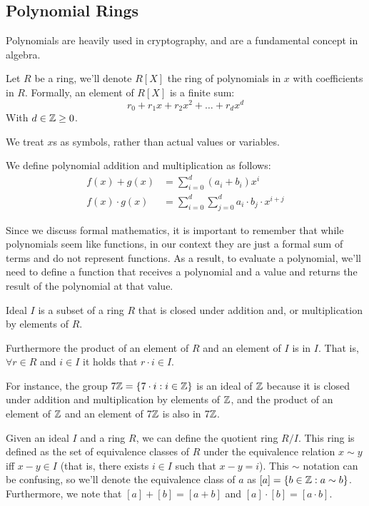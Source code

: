 \subsection{Polynomial Rings}
Polynomials are heavily used in cryptography, and are a fundamental concept in algebra.
\begin{defn}
    Let $R$ be a ring, we'll denote $R[X]$ the ring of polynomials
    in $x$ with coefficients in $R$. Formally, an element of $R[X]$ is a finite
    sum: $$ r_0 + r_1x +r_2x^2 +\dots +r_dx^d$$
    With $d\in\mathbb{Z}\ge0$.

    We treat $x$s as symbols, rather than actual values or variables.

    We define polynomial addition and multiplication as follows:
    \begin{align*}
        f(x) + g(x) &= \sum_{i=0}^{d}{(a_i+b_i)x^i} \\
        f(x) \cdot g(x) &= \sum_{i=0}^{d}{\sum_{j=0}^{d}{a_i\cdot b_j\cdot x^{i+j}}}
    \end{align*}
\end{defn} \label{def:polynomial-ring}\label{def:polynomial}

Since we discuss formal mathematics, it is important to remember that while polynomials seem like functions,
in our context they are just a formal sum of terms and do not represent functions.
As a result, to evaluate a polynomial, we'll need to define a function that receives a polynomial 
and a value and returns the result of the polynomial at that value.


\begin{defn}
    Ideal $I$ is a subset of a ring $R$ that is closed under addition and, or multiplication by elements of $R$.

    Furthermore the product of an element of $R$ and an element of $I$ is in $I$.
    That is, $\forall r\in R$ and $i\in I$ it holds that $r\cdot i\in I$.
\end{defn}

For instance, the group $7\mathbb{Z}=\{7\cdot i:i\in\mathbb{Z}\}$ is an ideal of $\mathbb{Z}$ because it is closed
under addition and multiplication by elements of $\mathbb{Z}$,
and the product of an element of $\mathbb{Z}$ and an element of $7\mathbb{Z}$ is also in $7\mathbb{Z}$.

Given an ideal $I$ and a ring $R$, we can define the quotient ring $R/I$.
This ring is defined as the set of equivalence classes of $R$ under the equivalence relation 
$x\sim y$ iff $x-y\in I$ (that is, there exists $i\in I$ such that $x-y=i$).
This $\sim$ notation can be confusing, so we'll denote the equivalence class of $a$ as $[a]=\{b\in \mathbb{Z} :a\sim b \}$.
Furthermore, we note that $[a]+[b]=[a+b]$ and $[a]\cdot[b]=[a\cdot b]$.

